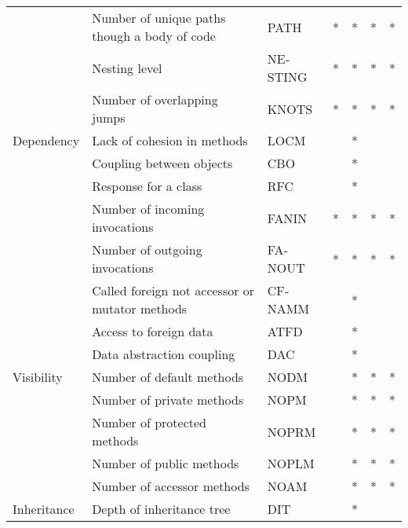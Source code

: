 \begin{table}[!h]
{\begin{latin}
\begin{tabular}{lllllll}
            & Number of unique paths though a body of   code   & PATH        & *      & *     & *    & *       \\
            & Nesting level                                    & NESTING     & *      & *     & *    & *       \\
            & Number of overlapping jumps                      & KNOTS       & *      & *     & *    & *       \\
            Dependency  & Lack of cohesion in methods                      & LOCM        &        & *     &      &         \\
            & Coupling between   objects                       & CBO         &        & *     &      &         \\
            & Response for a class                             & RFC         &        & *     &      &         \\
            & Number of incoming invocations                   & FANIN       & *      & *     & *    & *       \\
            & Number of outgoing invocations                   & FANOUT      & *      & *     & *    & *       \\
            & Called foreign not   accessor or mutator methods & CFNAMM      &        & *     &      &         \\
            & Access to foreign data                           & ATFD        &        & *     &      &         \\
            & Data abstraction   coupling                      & DAC         &        & *     &      &         \\
            Visibility  & Number of default   methods                      & NODM        &        & *     & *    & *       \\
            & Number of private   methods                      & NOPM        &        & *     & *    & *       \\
            & Number of protected   methods                    & NOPRM       &        & *     & *    & *       \\
            & Number of public   methods                       & NOPLM       &        & *     & *    & *       \\
            & Number of accessor   methods                     & NOAM        &        & *     & *    & *       \\
            Inheritance & Depth of inheritance   tree                      & DIT         &        & *     &      &         \\

\end{tabular}
\end{latin}}
\end{table}
